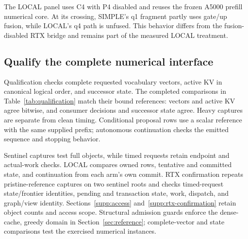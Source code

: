 The LOCAL panel uses C4 with P4 disabled and reuses the frozen A5000 prefill numerical core. At its crossing, SIMPLE's q1 fragment partly uses gate/up fusion, while LOCAL's q4 path is unfused. This behavior differs from the fusion-disabled RTX bridge and remains part of the measured LOCAL treatment.

\subsection{Qualify the complete numerical interface}
Qualification checks complete requested vocabulary vectors, active KV in canonical logical order, and successor state. The completed comparisons in Table~\ref{tab:qualification} match their bound references: vectors and active KV agree bitwise, and consumer decisions and successor state agree. Heavy captures are separate from clean timing. Conditional proposal rows use a scalar reference with the same supplied prefix; autonomous continuation checks the emitted sequence and stopping behavior.


Sentinel captures test full objects, while timed requests retain endpoint and actual-work checks. LOCAL compares owned rows, tentative and committed state, and continuation from each arm's own commit. RTX confirmation repeats pristine-reference captures on two sentinel roots and checks timed-request state/frontier identities, pending and transaction state, work, dispatch, and graph/view identity. Sections~\ref{supp:access} and~\ref{supp:rtx-confirmation} retain object counts and access scope. Structural admission guards enforce the dense-cache, greedy domain in Section~\ref{sec:reference}; complete-vector and state comparisons test the exercised numerical instances.
